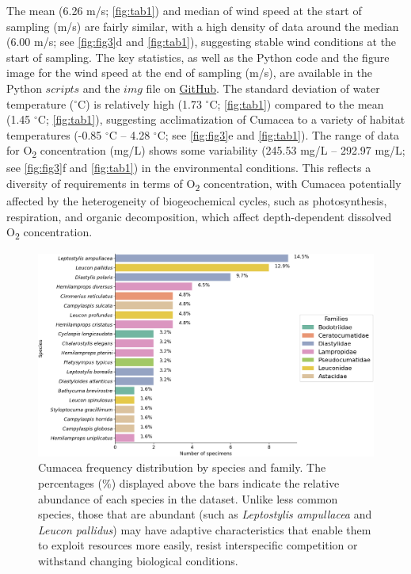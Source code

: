 The mean (6.26 m/s; \autoref{fig:tab1}) and median of wind speed at the start of sampling (m/s) are fairly similar, with a high density of data around the median (6.00 m/s; see \autoref{fig:fig3}d and \autoref{fig:tab1}), suggesting stable wind conditions at the start of sampling. The key statistics, as well as the Python code and the figure image for the wind speed at the end of sampling (m/s), are available in the Python $scripts$ and the $img$ file on \href{https://github.com/tahiri-lab/Cumacea_aPhyloGeo}{GitHub}. The standard deviation of water temperature ($^\circ$C) is relatively high (1.73 $^\circ$C; \autoref{fig:tab1}) compared to the mean (1.45 $^\circ$C; \autoref{fig:tab1}), suggesting acclimatization of Cumacea to a variety of habitat temperatures (-0.85 $^\circ$C – 4.28 $^\circ$C; see \autoref{fig:fig3}e and \autoref{fig:tab1}). The range of data for O\textsubscript{2} concentration (mg/L) shows some variability (245.53 mg/L – 292.97 mg/L; see \autoref{fig:fig3}f and \autoref{fig:tab1}) in the environmental conditions. This reflects a diversity of requirements in terms of O\textsubscript{2} concentration, with Cumacea potentially affected by the heterogeneity of biogeochemical cycles, such as photosynthesis, respiration, and organic decomposition, which affect depth-dependent dissolved O\textsubscript{2} concentration.

\begin{figure}[htbp]
    \centering
    \includegraphics[width=\textwidth]{figure2.png}
    \caption{Cumacea frequency distribution by species and family. The percentages (\%) displayed above the bars indicate the relative abundance of each species in the dataset. Unlike less common species, those that are abundant (such as \emph{Leptostylis ampullacea} and \emph{Leucon pallidus}) may have adaptive characteristics that enable them to exploit resources more easily, resist interspecific competition or withstand changing biological conditions. \label{fig:fig4}}
\end{figure}

